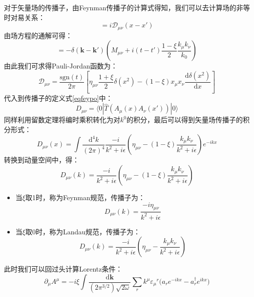 对于矢量场的传播子，由Feynman传播子的计算式得知，我们可以去计算场的非等时对易关系：
\begin{equation}
[A_\mu(x),A_\nu(x')]=i\mathscr{D}_{\mu\nu}(x-x')
\end{equation}
由场方程的通解可得：
\begin{equation}
[\tilde{a}_\mu(t,k),\tilde{a}_\nu(t',k')]=-\delta(\boldsymbol{k}-\boldsymbol{k}')\left(M_{\mu\nu}+i(t-t')\frac{1-\xi}{2}\frac{k_\mu k_\nu}{k_0}\right)
\end{equation}
由此我们可求得Pauli-Jordan函数为：
\begin{equation}
\mathscr{D}_{\mu\nu}=\frac{\mathrm{sgn}(t)}{2\pi}\left[	\eta_{\mu\nu}\frac{1+\xi}{2}\delta(x^2)-(1-\xi)x_\mu x_\nu\frac{\mathrm{d}\delta(x^2)}{\mathrm{d}x}\right]
\end{equation}
代入到传播子的定义式\eqref{eqfeypo}中：
\begin{equation}
D_{\mu\nu}=\langle0|\hat{T}(A_\mu(x)A_\nu(x'))|0\rangle
\end{equation}
同样利用留数定理将编时乘积转化为对$k^0$的积分，最后可以得到矢量场传播子的积分形式：
\begin{equation}
D_{\mu\nu}(x)=\int\frac{\mathrm{d}^4k}{(2\pi)^4}\frac{-i}{k^2+i\epsilon}\left(\eta_{\mu\nu}-(1-\xi)\frac{k_\mu k_\nu}{k^2+i\epsilon}\right)e^{-ikx}
\end{equation}
转换到动量空间中，得：
\begin{equation}
D_{\mu\nu}(k)=\frac{-i}{k^2+i\epsilon}\left(\eta_{\mu\nu}-(1-\xi)\frac{k_\mu k_\nu}{k^2+i\epsilon}\right)
\end{equation}
\begin{itemize}
	\item {当$\xi$取1时，称为Feynman规范，传播子为：
		\begin{equation}
		D_{\mu\nu}(k)=\frac{-i\eta_{\mu\nu}}{k^2+i\epsilon}
		\end{equation}}
	\item {当$\xi$取0时，称为Landau规范，传播子为：
		\begin{equation}
		D_{\mu\nu}(k)=\frac{-i}{k^2+i\epsilon}\left(\eta_{\mu\nu}-\frac{k_\mu k_\nu}{k^2+i\epsilon}\right)
		\end{equation}}
\end{itemize}
此时我们可以回过头计算Lorentz条件：
\begin{equation}
\partial_\mu A^\mu=-i\xi\int\frac{\mathrm{d}\boldsymbol{k}}{(2\pi^{3/2})\sqrt{2\omega}}\sum_r k^\mu{\varepsilon_\mu}^r\Big(a_r e^{-ikx}-a_r^\dagger e^{ikx}\Big)
\end{equation}

